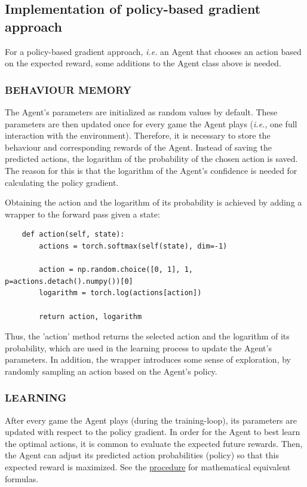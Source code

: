 \documentclass{article}
\renewenvironment{leftbar}[1][\hsize]{
    \def\FrameCommand{{\color{barcolor}\vrule width 0.5pt \hspace{10pt}}}
    \MakeFramed{\hsize#1 \advance\hsize-\width \FrameRestore}
}{\endMakeFramed}
\begin{document}
\subsection*{Implementation of policy-based gradient approach}
\begin{leftbar}

    For a policy-based gradient approach, \textit{i.e.} an Agent that chooses an action based on the expected reward, some additions to the Agent class above is needed.

    \subsubsection*{BEHAVIOUR MEMORY}

    The Agent's parameters are initialized as random values by default. These parameters are then updated once for every game the Agent plays (\textit{i.e.}, one full interaction with the environment). Therefore, it is necessary to store the behaviour and corresponding rewards of the Agent. Instead of saving the predicted actions, the logarithm of the probability of the chosen action is saved. The reason for this is that the logarithm of the Agent's confidence is needed for calculating the policy gradient.

    Obtaining the action and the logarithm of its probability is achieved by adding a wrapper to the forward pass given a state:

    \begin{lstlisting}
    def action(self, state):
        actions = torch.softmax(self(state), dim=-1)

        action = np.random.choice([0, 1], 1, p=actions.detach().numpy())[0]
        logarithm = torch.log(actions[action])

        return action, logarithm
    \end{lstlisting}

    Thus, the 'action' method returns the selected action and the logarithm of its probability, which are used in the learning process to update the Agent's parameters. In addition, the wrapper introduces some sense of exploration, by randomly sampling an action based on the Agent's policy.

    \subsubsection*{LEARNING}

    After every game the Agent plays (during the training-loop), its parameters are updated with respect to the policy gradient. In order for the Agent to best learn the optimal actions, it is common to evaluate the expected future rewards. Then, the Agent can adjust its predicted action probabilities (policy) so that this expected reward is maximized. See the \hyperlink{sec:policy-based-approach}{procedure} for mathematical equivalent formulas.


\end{leftbar}
\end{document}
